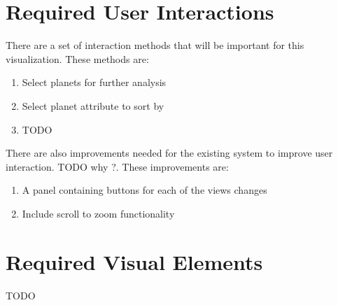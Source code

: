 \documentclass[11pt
              , a4paper
              , twoside
              , openright
              ]{report}
\begin{document}
\section{Required User Interactions}
There are a set of interaction methods that will be important for this visualization. These methods are:
\begin{enumerate}
 \item Select planets for further analysis
 \item Select planet attribute to sort by
 \item TODO
\end{enumerate}
There are also improvements needed for the existing system to improve user interaction. TODO why ?. These improvements are:
\begin{enumerate}
 \item A panel containing buttons for each of the views changes
 \item Include scroll to zoom functionality
\end{enumerate}
\section{Required Visual Elements}
TODO
\end{document}
